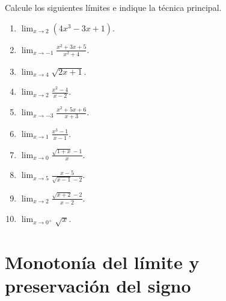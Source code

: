 \documentclass[10pt,a5paper]{article}
\newif\ifmostrarSoluciones
\begin{document}
\begin{ejercicios}
Calcule los siguientes límites e indique la técnica principal.
\begin{enumerate}
  \item $\displaystyle\lim_{x\to2}(4x^3-3x+1)$.
  \item $\displaystyle\lim_{x\to-1}\frac{x^2+3x+5}{x^2+4}$.
  \item $\displaystyle\lim_{x\to4}\sqrt{2x+1}$.
  \item $\displaystyle\lim_{x\to2}\frac{x^2-4}{x-2}$.
  \item $\displaystyle\lim_{x\to-3}\frac{x^2+5x+6}{x+3}$.
  \item $\displaystyle\lim_{x\to1}\frac{x^3-1}{x-1}$.
  \item $\displaystyle\lim_{x\to0}\frac{\sqrt{1+x}-1}{x}$.
  \item $\displaystyle\lim_{x\to5}\frac{x-5}{\sqrt{x-1}-2}$.
  \item $\displaystyle\lim_{x\to2}\frac{\sqrt{x+2}-2}{x-2}$.
  \item $\displaystyle\lim_{x\to0^+}\sqrt{x}$.
\end{enumerate}
\end{ejercicios}

\ifmostrarSoluciones
\begin{solucion}[de los ejercicios]
\begin{enumerate}
  \item $27$, por sustitución directa.
  \item $3/5$, por sustitución directa.
  \item $3$, por sustitución directa.
  \item $4$, pues $(x^2-4)/(x-2)=x+2$ para $x\neq2$.
  \item $-1$, pues $(x+2)(x+3)/(x+3)=x+2$ para $x\neq-3$.
  \item $3$, usando $x^3-1=(x-1)(x^2+x+1)$.
  \item $1/2$, al racionalizar el numerador.
  \item $4$, porque el cociente se simplifica a $\sqrt{x-1}+2$.
  \item $1/4$, al racionalizar el numerador.
  \item $0$; solo se considera la aproximación por la derecha.
\end{enumerate}
\end{solucion}
\fi

\section*{Monotonía del límite y preservación del signo}
\end{document}

